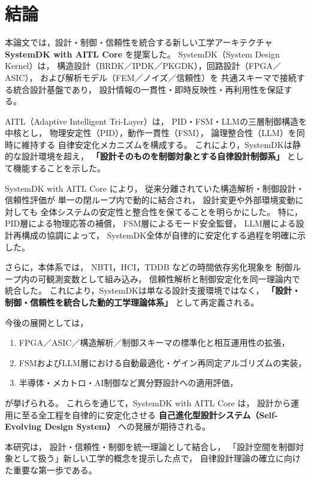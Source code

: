 \section{結論}

本論文では，設計・制御・信頼性を統合する新しい工学アーキテクチャ
\textbf{SystemDK with AITL Core} を提案した。
SystemDK（System Design Kernel）は，
構造設計（BRDK／IPDK／PKGDK），回路設計（FPGA／ASIC），
および解析モデル（FEM／ノイズ／信頼性）を
共通スキーマで接続する統合設計基盤であり，
設計情報の一貫性・即時反映性・再利用性を保証する。

AITL（Adaptive Intelligent Tri-Layer）は，
PID・FSM・LLMの三層制御構造を中核とし，
物理安定性（PID），動作一貫性（FSM），
論理整合性（LLM）を同時に維持する
自律安定化メカニズムを構成する。
これにより，SystemDKは静的な設計環境を超え，
\textbf{「設計そのものを制御対象とする自律設計制御系」}
として機能することを示した。

SystemDK with AITL Core により，
従来分離されていた構造解析・制御設計・信頼性評価が
単一の閉ループ内で動的に結合され，
設計変更や外部環境変動に対しても
全体システムの安定性と整合性を保てることを明らかにした。
特に，PID層による物理応答の補償，
FSM層によるモード安全監督，
LLM層による設計再構成の協調によって，
SystemDK全体が自律的に安定化する過程を明確に示した。

さらに，本体系では，
NBTI，HCI，TDDB などの時間依存劣化現象を
制御ループ内の可観測変数として組み込み，
信頼性解析と制御安定化を同一理論内で統合した。
これにより，SystemDKは単なる設計支援環境ではなく，
\textbf{「設計・制御・信頼性を統合した動的工学理論体系」}
として再定義される。

今後の展開としては，
\begin{enumerate}
  \item FPGA／ASIC／構造解析／制御スキーマの標準化と相互運用性の拡張，
  \item FSMおよびLLM層における自動最適化・ゲイン再同定アルゴリズムの実装，
  \item 半導体・メカトロ・AI制御など異分野設計への適用評価，
\end{enumerate}
が挙げられる。
これらを通じて，SystemDK with AITL Core は，
設計から運用に至る全工程を自律的に安定化させる
\textbf{自己進化型設計システム（Self-Evolving Design System）}
への発展が期待される。

本研究は，
設計・信頼性・制御を統一理論として結合し，
「設計空間を制御対象として扱う」新しい工学的概念を提示した点で，
自律設計理論の確立に向けた重要な第一歩である。
